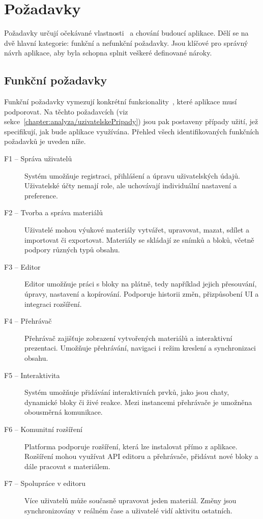 \section{Požadavky}

Požadavky určují očekávané vlastnosti~\cite{uml_2007} a chování budoucí aplikace. Dělí se na dvě hlavní kategorie: funkční a nefunkční požadavky. Jsou klíčové pro správný návrh aplikace, aby byla schopna splnit veškeré definované nároky.

\subsection{Funkční požadavky}

Funkční požadavky vymezují konkrétní funkcionality~\cite{uml_2007}, které aplikace musí podporovat. 
Na těchto požadavcích (viz sekce~\ref{chapter:analyza/uzivatelskePripady}) jsou pak postaveny případy užití, jež specifikují, jak bude aplikace využívána. 
Přehled všech identifikovaných funkčních požadavků je uveden níže.


\begin{description}
    \item[F1 -- Správa uživatelů]
    Systém umožňuje registraci, přihlášení a úpravu uživatelských údajů. Uživatelské účty nemají role, ale uchovávají individuální nastavení a preference.

    \item[F2 -- Tvorba a správa materiálů]
    Uživatelé mohou výukové materiály vytvářet, upravovat, mazat, sdílet a importovat či exportovat. Materiály se skládají ze snímků a bloků, včetně podpory různých typů obsahu.

    \item[F3 -- Editor]
    Editor umožňuje práci s bloky na plátně, tedy například jejich přesouvání, úpravy, nastavení a kopírování. Podporuje historii změn, přizpůsobení UI a integraci rozšíření.

    \item[F4 -- Přehrávač]
    Přehrávač zajišťuje zobrazení vytvořených materiálů a interaktivní prezentaci. Umožňuje přehrávání, navigaci i režim kreslení a synchronizaci obsahu.

    \item[F5 -- Interaktivita]
    Systém umožňuje přidávání interaktivních prvků, jako jsou chaty, dynamické bloky či živé reakce. Mezi instancemi přehrávače je umožněna obousměrná komunikace.

    \item[F6 -- Komunitní rozšíření]
    Platforma podporuje rozšíření, která lze instalovat přímo z aplikace. Rozšíření mohou využívat API editoru a přehrávače, přidávat nové bloky a dále pracovat s materiálem.

    \item[F7 -- Spolupráce v editoru]
    Více uživatelů může současně upravovat jeden materiál. Změny jsou synchronizovány v reálném čase a uživatelé vidí aktivitu ostatních.
\end{description}




